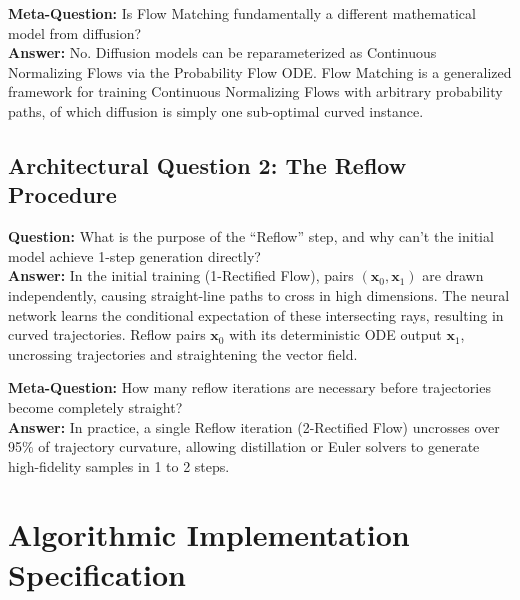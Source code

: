 \documentclass[11pt,a4paper]{article}
\theoremstyle{definition}
\begin{document}
\textbf{Meta-Question:} Is Flow Matching fundamentally a different mathematical model from diffusion?\\
\textbf{Answer:} No. Diffusion models can be reparameterized as Continuous Normalizing Flows via the Probability Flow ODE. Flow Matching is a generalized framework for training Continuous Normalizing Flows with arbitrary probability paths, of which diffusion is simply one sub-optimal curved instance.

\subsection{Architectural Question 2: The Reflow Procedure}
\textbf{Question:} What is the purpose of the ``Reflow'' step, and why can't the initial model achieve 1-step generation directly?\\
\textbf{Answer:} In the initial training (1-Rectified Flow), pairs $(\mathbf{x}_0, \mathbf{x}_1)$ are drawn independently, causing straight-line paths to cross in high dimensions. The neural network learns the conditional expectation of these intersecting rays, resulting in curved trajectories. Reflow pairs $\mathbf{x}_0$ with its deterministic ODE output $\mathbf{x}_1$, uncrossing trajectories and straightening the vector field.

\textbf{Meta-Question:} How many reflow iterations are necessary before trajectories become completely straight?\\
\textbf{Answer:} In practice, a single Reflow iteration (2-Rectified Flow) uncrosses over 95\% of trajectory curvature, allowing distillation or Euler solvers to generate high-fidelity samples in 1 to 2 steps.

\section{Algorithmic Implementation Specification}
\end{document}
